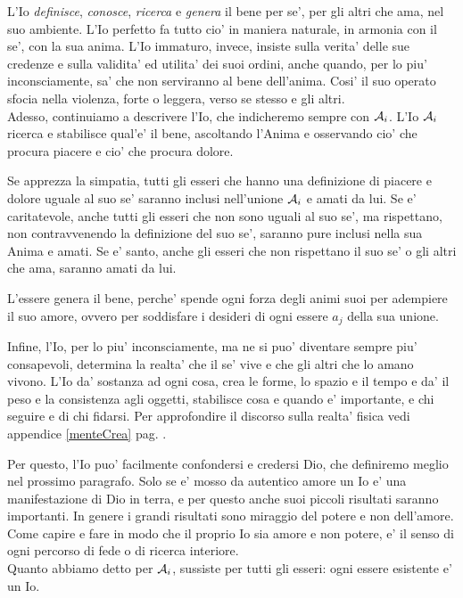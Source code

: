     L'Io \emph{definisce}, \emph{conosce}, \emph{ricerca} e \emph{genera} il bene per se', per gli altri che ama, nel suo ambiente. L'Io perfetto fa tutto cio' in maniera naturale, in armonia con il se', con la sua anima. L'Io immaturo, invece, insiste sulla verita' delle sue credenze e sulla validita' ed utilita' dei suoi ordini, anche quando, per lo piu' inconsciamente, sa' che non serviranno al bene dell'anima. Cosi' il suo operato sfocia nella violenza, forte o leggera, verso se stesso e gli altri.\\

Adesso, continuiamo a descrivere l'Io, che indicheremo sempre con $\mathcal{A}_i$. L'Io $\mathcal{A}_i$ ricerca e stabilisce qual'e' il bene, ascoltando l'Anima e osservando cio' che procura piacere e cio' che procura dolore. 

    Se apprezza la simpatia, tutti gli esseri che hanno una definizione di piacere e dolore uguale al suo se' saranno inclusi nell'unione $\mathcal{A}_i$ e amati da lui. Se e' caritatevole, anche tutti gli esseri che non sono uguali al suo se', ma rispettano, non contravvenendo la definizione del suo se', saranno pure inclusi nella sua Anima e amati. Se e' santo, anche gli esseri che non rispettano il suo se' o gli altri che ama, saranno amati da lui.

    L'essere genera il bene, perche' spende ogni forza degli animi suoi per adempiere il suo amore, ovvero per soddisfare i desideri di ogni essere $a_j$ della sua unione.

    Infine, l'Io, per lo piu' inconsciamente, ma ne si puo' diventare sempre piu' consapevoli, determina la realta' che il se' vive e che gli altri che lo amano vivono. L'Io da' sostanza ad ogni cosa, crea le forme, lo spazio e il tempo e da' il peso e la consistenza agli oggetti, stabilisce cosa e quando e' importante, e chi seguire e di chi fidarsi. Per approfondire il discorso sulla realta' fisica vedi appendice \ref{menteCrea} pag. \pageref{menteCrea}.

    Per questo, l'Io puo' facilmente confondersi e credersi Dio, che definiremo meglio nel prossimo paragrafo. Solo se e' mosso da autentico amore un Io e' una manifestazione di Dio in terra, e per questo anche suoi piccoli risultati saranno importanti. In genere i grandi risultati sono miraggio del potere e non dell'amore. Come capire e fare in modo che il proprio Io sia amore e non potere, e' il senso di ogni percorso di fede o di ricerca interiore. \\

    Quanto abbiamo detto per $\mathcal{A}_i$, sussiste per tutti gli esseri: ogni essere esistente e' un Io.

